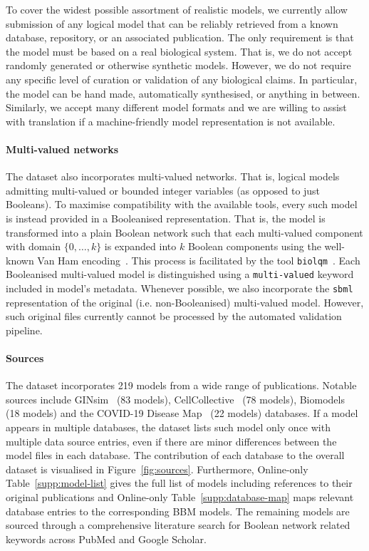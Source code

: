 \documentclass[fleqn,10pt]{wlscirep}
\newcommand{\todo}[1]{{\color{red} #1}}
\begin{document}
To cover the widest possible assortment of realistic models, we currently allow submission of any logical model that can be reliably retrieved from a known database, repository, or an associated publication. The only requirement is that the model must be based on a real biological system. That is, we do not accept randomly generated or otherwise synthetic models.  However, we do not require any specific level of curation or validation of any biological claims. In particular, the model can be hand made, automatically synthesised, or anything in between. Similarly, we accept many different model formats and we are willing to assist with translation if a machine-friendly model representation is not available.

\paragraph{Multi-valued networks}

The dataset also incorporates multi-valued networks. That is, logical models admitting multi-valued or bounded integer variables (as opposed to just Booleans). To maximise compatibility with the available tools, every such model is instead provided in a Booleanised representation. That is, the model is transformed into a plain Boolean network such that each multi-valued component with domain $\{ 0, \ldots, k\}$ is expanded into $k$ Boolean components using the well-known Van Ham encoding~\cite{van-ham}. This process is facilitated by the tool \texttt{biolqm}~\cite{biolqm}. Each Booleanised multi-valued model is distinguished using a \texttt{multi-valued} keyword included in model's metadata. Whenever possible, we also incorporate the \texttt{sbml}~\cite{sbml-qual} representation of the original (i.e. non-Booleanised) multi-valued model. However, such original files currently cannot be processed by the automated validation pipeline.

\paragraph*{Sources} 

The dataset incorporates 219 models from a wide range of publications. Notable sources include GINsim~\cite{ginsim} (83 models), CellCollective~\cite{cell-collective} (78 models), Biomodels~\cite{biomodels} (18 models) and the COVID-19 Disease Map~\cite{bbm-covid-disease-map} (22 models) databases. If a model appears in multiple databases, the dataset lists such model only once with multiple data source entries, even if there are minor differences between the model files in each database. The contribution of each database to the overall dataset is visualised in Figure~\ref{fig:sources}. \todo{Furthermore, Online-only Table~\ref{supp:model-list} gives the full list of models including references to their original publications and Online-only Table~\ref{supp:database-map} maps relevant database entries to the corresponding BBM models. The remaining models are sourced through a comprehensive literature search for Boolean network related keywords across PubMed and Google Scholar.}
\end{document}
